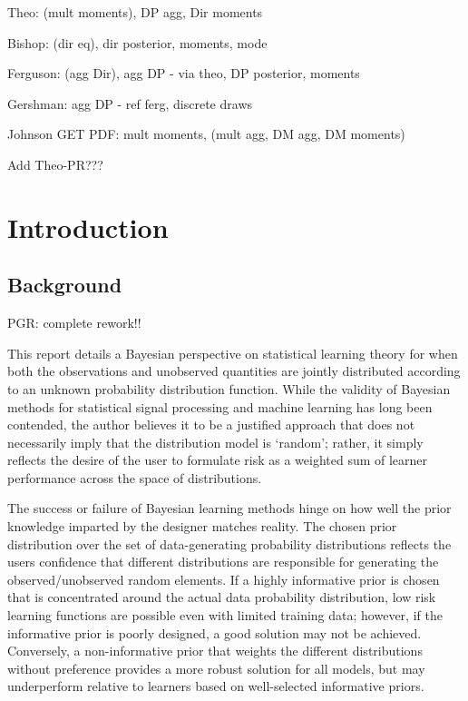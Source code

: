 \documentclass[12pt]{report}
\newcommand{\todolow}[1]{\todo[inline,color=blue!50,linecolor=red]{#1}}
\begin{document}
\todolow{jeffrey prior, fisher info?}




\todolow{bibliography}

Theo: (mult moments), DP agg, Dir moments

Bishop: (dir eq), dir posterior, moments, mode

Ferguson: (agg Dir), agg DP - via theo, DP posterior, moments

Gershman: agg DP - ref ferg, discrete draws

Johnson GET PDF: mult moments, (mult agg, DM agg, DM moments)

Add Theo-PR???

\newpage





\chapter{Introduction}


\section{Background}

PGR: complete rework!!

This report details a Bayesian perspective on statistical learning theory for when both the observations and unobserved quantities are jointly distributed according to an unknown probability distribution function. While the validity of Bayesian methods for statistical signal processing and machine learning has long been contended, the author believes it to be a justified approach that does not necessarily imply that the distribution model is `random'; rather, it simply reflects the desire of the user to formulate risk as a weighted sum of learner performance across the space of distributions. 

The success or failure of Bayesian learning methods hinge on how well the prior knowledge imparted by the designer matches reality. The chosen prior distribution over the set of data-generating probability distributions reflects the users confidence that different distributions are responsible for generating the observed/unobserved random elements. If a highly informative prior \cite{box} is chosen that is concentrated around the actual data probability distribution, low risk learning functions are possible even with limited training data; however, if the informative prior is poorly designed, a good solution may not be achieved. Conversely, a non-informative prior that weights the different distributions without preference provides a more robust solution for all models, but may underperform relative to learners based on well-selected informative priors.
\end{document}
